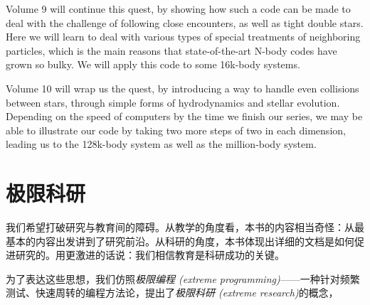 Volume 9 will continue this quest, by showing how such a code can be made to deal with the challenge of following close encounters, as well as tight double stars. Here we will learn to deal with various types of special treatments of neighboring particles, which is the main reasons that state-of-the-art N-body codes have grown so bulky. We will apply this
code to some 16k-body systems.

Volume 10 will wrap us the quest, by introducing a way to handle even collisions between stars, through simple forms of hydrodynamics and stellar evolution. Depending on the speed of computers by the time we finish our series, we may be able to illustrate our code by taking two more steps of two in each dimension, leading us to the 128k-body
system as well as the million-body system.

\section*{极限科研}
我们希望打破研究与教育间的障碍。从教学的角度看，本书的内容相当奇怪：从最基本的内容出发讲到了研究前沿。从科研的角度，本书体现出详细的文档是如何促进研究的。用更激进的话说：我们相信教育是科研成功的关键。

为了表达这些思想，我们仿照{\it 极限编程 (extreme programming)}——一种针对频繁测试、快速周转的编程方法论，提出了{\it 极限科研 (extreme research)}的概念，